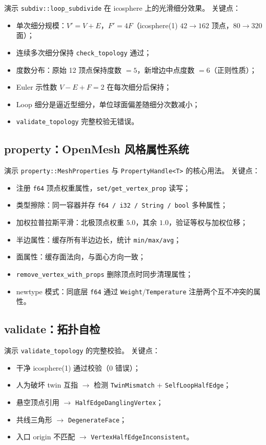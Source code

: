 \documentclass[11pt,a4paper]{article}
\begin{document}
演示 \texttt{subdiv::loop\_subdivide} 在 icosphere 上的光滑细分效果。
关键点：
\begin{itemize}
  \item 单次细分规模：$V' = V + E$，$F' = 4F$（icosphere(1) $42 \to 162$ 顶点，$80 \to 320$ 面）；
  \item 连续多次细分保持 \texttt{check\_topology} 通过；
  \item 度数分布：原始 12 顶点保持度数 $=5$，新增边中点度数 $=6$（正则性质）；
  \item Euler 示性数 $V - E + F = 2$ 在每次细分后保持；
  \item Loop 细分是逼近型细分，单位球面偏差随细分次数减小；
  \item \texttt{validate\_topology} 完整校验无错误。
\end{itemize}

\subsection{property：OpenMesh 风格属性系统}

演示 \texttt{property::MeshProperties} 与 \texttt{PropertyHandle<T>} 的核心用法。
关键点：
\begin{itemize}
  \item 注册 \texttt{f64} 顶点权重属性，\texttt{set/get\_vertex\_prop} 读写；
  \item 类型擦除：同一容器并存 \texttt{f64 / i32 / String / bool} 多种属性；
  \item 加权拉普拉斯平滑：北极顶点权重 $5.0$，其余 $1.0$，验证等权与加权位移；
  \item 半边属性：缓存所有半边边长，统计 \texttt{min/max/avg}；
  \item 面属性：缓存面法向，与面心方向一致；
  \item \texttt{remove\_vertex\_with\_props} 删除顶点时同步清理属性；
  \item newtype 模式：同底层 \texttt{f64} 通过 \texttt{Weight}/\texttt{Temperature}
        注册两个互不冲突的属性。
\end{itemize}

\subsection{validate：拓扑自检}

演示 \texttt{validate\_topology} 的完整校验。
关键点：
\begin{itemize}
  \item 干净 icosphere(1) 通过校验（0 错误）；
  \item 人为破坏 twin 互指 $\to$ 检测 \texttt{TwinMismatch} + \texttt{SelfLoopHalfEdge}；
  \item 悬空顶点引用 $\to$ \texttt{HalfEdgeDanglingVertex}；
  \item 共线三角形 $\to$ \texttt{DegenerateFace}；
  \item 入口 origin 不匹配 $\to$ \texttt{VertexHalfEdgeInconsistent}。
\end{itemize}
\end{document}
